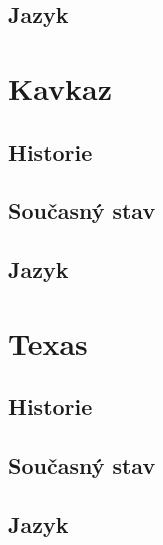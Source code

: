 \hypertarget{jazyk-1}{%
\subsection*{Jazyk}\label{jazyk-1}}

\hypertarget{kavkaz}{%
\section{Kavkaz}\label{kavkaz}}

\hypertarget{historie-2}{%
\subsection*{Historie}\label{historie-2}}

\hypertarget{souux10dasnuxfd-stav-2}{%
\subsection*{Současný stav}\label{souux10dasnuxfd-stav-2}}

\hypertarget{jazyk-2}{%
\subsection*{Jazyk}\label{jazyk-2}}

\hypertarget{texas}{%
\section{Texas}\label{texas}}

\hypertarget{historie-3}{%
\subsection*{Historie}\label{historie-3}}

\hypertarget{souux10dasnuxfd-stav-3}{%
\subsection*{Současný stav}\label{souux10dasnuxfd-stav-3}}

\hypertarget{jazyk-3}{%
\subsection*{Jazyk}\label{jazyk-3}}
